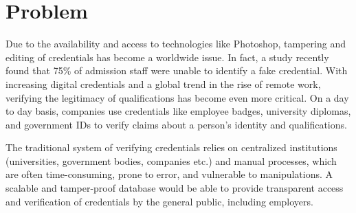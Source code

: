 \section{Problem}

Due to the availability and access to technologies like Photoshop, tampering and editing of
credentials has become a worldwide issue. In fact, a study recently found that 75\% of admission staff were unable to identify a fake credential. With increasing digital credentials and a global trend in the rise of remote work, verifying the legitimacy of qualifications has become even more critical. On a day to day basis, companies use credentials like employee badges, university diplomas, and government IDs to verify claims about a person's identity and qualifications.

The traditional system of verifying credentials relies on centralized institutions (universities, government bodies, companies etc.) and manual processes, which are often time-consuming, prone to error, and vulnerable to manipulations. A scalable and tamper-proof database would be able to provide transparent access and verification of credentials by the general public, including employers.

